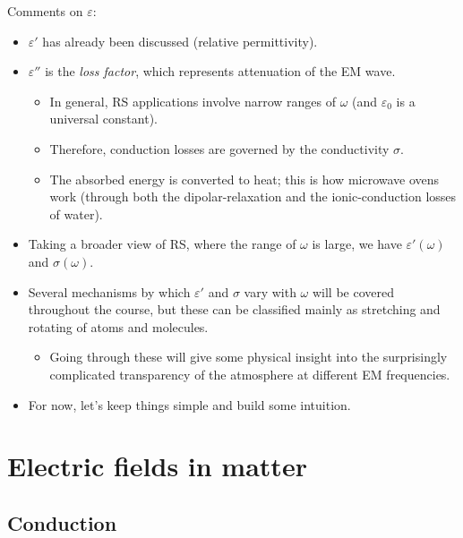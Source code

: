 \documentclass[11pt, oneside]{article}
\begin{document}
Comments on $\varepsilon$:
\begin{itemize}
	\item $\varepsilon'$ has already been discussed (relative permittivity).
	\item $\varepsilon''$ is the \emph{loss factor}, which represents attenuation of the EM wave.
	\begin{itemize}
		\item In general, RS applications involve narrow ranges of $\omega$ (and $\varepsilon_0$ is a universal constant).
		\item Therefore, conduction losses are governed by the conductivity $\sigma$.
		\item The absorbed energy is converted to heat; this is how microwave ovens work (through both the dipolar-relaxation and the ionic-conduction losses of water).
	\end{itemize}
	\item Taking a broader view of RS, where the range of $\omega$ is large, we have $\varepsilon'(\omega)$ and $\sigma(\omega)$.
	\item Several mechanisms by which $\varepsilon'$ and $\sigma$ vary with $\omega$ will be covered throughout the course, but these can be classified mainly as stretching and rotating of atoms and molecules.
	\begin{itemize}
		\item Going through these will give some physical insight into the surprisingly complicated transparency of the atmosphere at different EM frequencies.
	\end{itemize}
	\item For now, let's keep things simple and build some intuition.
\end{itemize}

\section{Electric fields in matter}

\subsection{Conduction}
\end{document}
